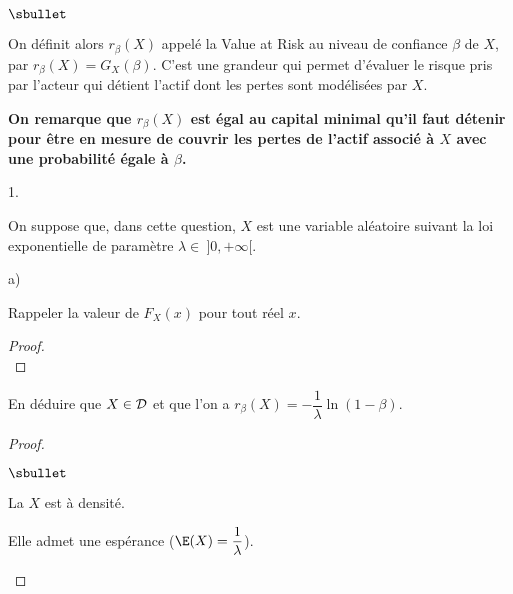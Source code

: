 \begin{noliste}{$\sbullet$}
  \item On définit alors $r_\beta(X)$ appelé la \og Value at 
  Risk \fg au niveau de confiance $\beta$ de $X$, par 
  $r_\beta(X)=G_X(\beta)$. C'est une grandeur qui permet d'évaluer 
  le risque pris par l'acteur qui détient l'actif dont les pertes 
  sont modélisées par $X$.
  
  \item {\bf On remarque que $r_\beta(X)$ est égal au 
  capital minimal qu'il faut détenir pour être en mesure de 
  couvrir les pertes de l'actif associé à $X$ avec une probabilité 
  égale à $\beta$.}
\end{noliste}

\begin{noliste}{1.}
  \setlength{\itemsep}{4mm}
  \setcounter{enumi}{1}
  \item On suppose que, dans cette question, $X$ est une variable 
  aléatoire suivant la loi exponentielle de paramètre $\lambda \in 
  \ ]0,+\infty[$.
  \begin{noliste}{a)}
    \setlength{\itemsep}{2mm}
    \item Rappeler la valeur de $F_X(x)$ pour tout réel $x$.
    
    \begin{proof}~
      ~\\[-1cm]
    \end{proof}

    
    \item En déduire que $X \in {\cal D}$ et que l'on a 
    $r_\beta(X)=-\dfrac1\lambda \ln(1-\beta)$.
    
    \begin{proof}~
      \begin{noliste}{$\sbullet$}
	\item La \var $X$ est à densité.
	\item Elle admet une espérance ($\E(X) = \dfrac{1}{\lambda}$).
	
	
	\newpage
	

\end{noliste}
\end{proof}
\end{noliste}
\end{noliste}
